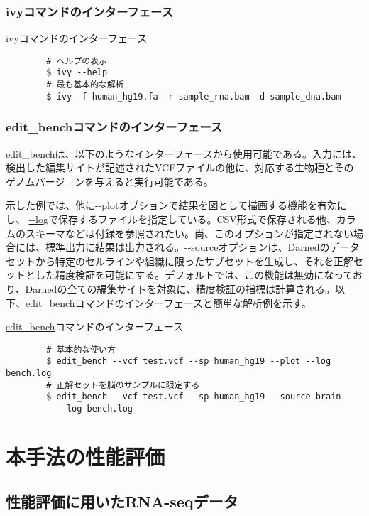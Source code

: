 \subsubsection{ivyコマンドのインターフェース}
\begin{itembox}[l]{\url{ivy}コマンドのインターフェース}
	\begin{verbatim}
		# ヘルプの表示
		$ ivy --help
		# 最も基本的な解析
		$ ivy -f human_hg19.fa -r sample_rna.bam -d sample_dna.bam
	\end{verbatim}
\end{itembox}

\subsubsection{edit\_benchコマンドのインターフェース}
edit\_benchは、以下のようなインターフェースから使用可能である。入力には、検出した編集サイトが記述されたVCFファイルの他に、対応する生物種とそのゲノムバージョンを与えると実行可能である。
\par
示した例では、他に\url{--plot}オプションで結果を図として描画する機能を有効にし、
\url{--log}で保存するファイルを指定している。CSV形式で保存される他、カラムのスキーマなどは付録を参照されたい。尚、このオプションが指定されない場合には、標準出力に結果は出力される。\url{--source}オプションは、Darnedのデータセットから特定のセルラインや組織に限ったサブセットを生成し、それを正解セットとした精度検証を可能にする。デフォルトでは、この機能は無効になっており、Darnedの全ての編集サイトを対象に、精度検証の指標は計算される。以下、edit\_benchコマンドのインターフェースと簡単な解析例を示す。
\par
\begin{itembox}[l]{\url{edit_bench}コマンドのインターフェース}
	\begin{verbatim}
		# 基本的な使い方
		$ edit_bench --vcf test.vcf --sp human_hg19 --plot --log bench.log
		# 正解セットを脳のサンプルに限定する
		$ edit_bench --vcf test.vcf --sp human_hg19 --source brain  
		  --log bench.log
	\end{verbatim}
\end{itembox}

\newpage

\section{本手法の性能評価}
\subsection{性能評価に用いたRNA-seqデータ}
